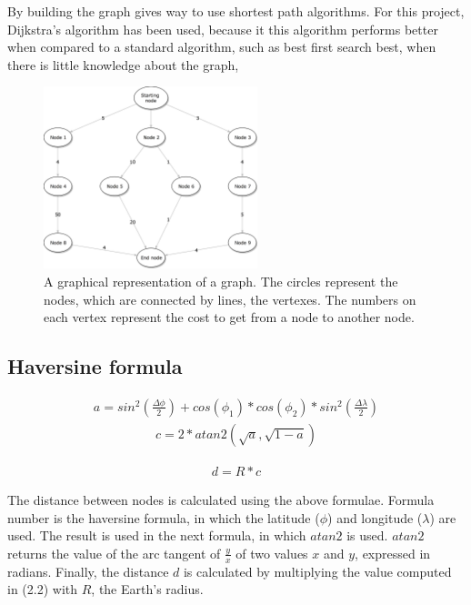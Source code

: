 By building the graph gives way to use shortest path algorithms. For this project, Dijkstra's algorithm has been used, because it this algorithm performs better when compared to a standard algorithm, such as best first search best, when there is little knowledge about the graph,

\begin{figure}[H]
    \centering
    \includegraphics[width=235px, height=200px]{Background/graph.png}
    \centering
    \caption{A graphical representation of a  graph. The circles represent the nodes, which are connected by lines, the vertexes. The numbers on each vertex represent the cost to get from a node to another node.}
    \label{fig:graph}
\end{figure}

\subsection{Haversine formula}
\label{sec:haversine}

\begin{align}
    a = sin^{2}(\frac{\Delta\phi}{2}) + cos(\phi_1) * cos(\phi_2) * sin^{2}(\frac{\Delta\lambda}{2})
\end{align}
\begin{align}
    c = 2 * atan2(\sqrt{a}, \sqrt{1-a})
\end{align}
    
\begin{align}
    d = R * c
\end{align}

The distance between nodes is calculated using the above formulae. Formula number is the haversine formula, in which the latitude ($\phi$) and longitude ($\lambda$) are used. The result is used in the next formula, in which $atan2$ is used. $atan2$ returns the value of the arc tangent of $\frac{y}{x}$ of two values $x$ and $y$, expressed in radians. Finally, the distance $d$ is calculated by multiplying the value computed in (2.2) with $R$, the Earth's radius.

